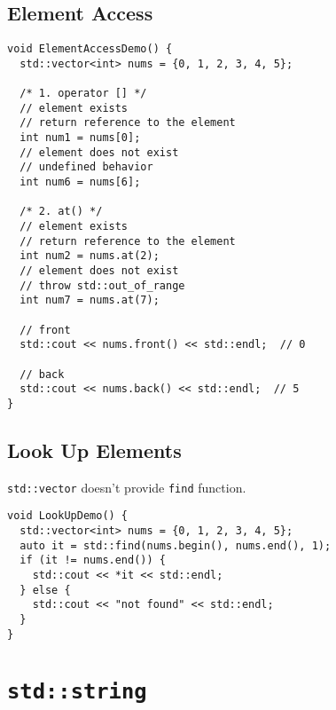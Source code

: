 \subsection{Element Access}
\begin{lstlisting}[numbers=none]
void ElementAccessDemo() {
  std::vector<int> nums = {0, 1, 2, 3, 4, 5};

  /* 1. operator [] */
  // element exists
  // return reference to the element
  int num1 = nums[0];
  // element does not exist
  // undefined behavior
  int num6 = nums[6];

  /* 2. at() */
  // element exists
  // return reference to the element
  int num2 = nums.at(2);
  // element does not exist
  // throw std::out_of_range
  int num7 = nums.at(7);

  // front
  std::cout << nums.front() << std::endl;  // 0

  // back
  std::cout << nums.back() << std::endl;  // 5
}
\end{lstlisting}

\subsection{Look Up Elements}
{\colorbox{CodeBackground}{\lstinline|std::vector|}} doesn't provide {\colorbox{CodeBackground}{\lstinline|find|}} function.
\begin{lstlisting}
void LookUpDemo() {
  std::vector<int> nums = {0, 1, 2, 3, 4, 5};
  auto it = std::find(nums.begin(), nums.end(), 1);
  if (it != nums.end()) {
    std::cout << *it << std::endl;
  } else {
    std::cout << "not found" << std::endl;
  }
}
\end{lstlisting}

\section{{\colorbox{CodeBackground}{\lstinline|std::string|}}}
